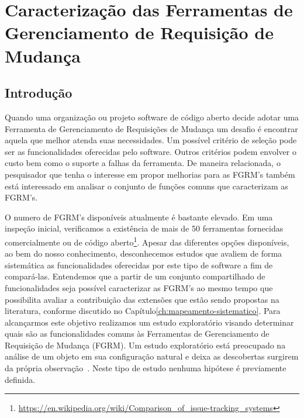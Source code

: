 \chapter{Caracterização das Ferramentas de Gerenciamento de Requisição de
	Mudança}
\label{ch:caracterizacao}


\section{Introdução}

Quando uma organização ou projeto software de código aberto decide adotar uma
Ferramenta de Gerenciamento de Requisições de Mudança um desafio é encontrar
aquela que melhor atenda suas necessidades. Um possível critério de seleção pode
ser as funcionalidades oferecidas pelo software. Outros critérios podem envolver
o custo bem como o suporte a falhas da ferramenta. De maneira relacionada, o
pesquisador que tenha o interesse em propor melhorias para as FGRM's também está
interessado em analisar o conjunto de funções comuns que caracterizam as FGRM's.

O numero de FGRM's disponíveis atualmente é bastante elevado. Em uma inspeção
inicial, verificamos a existência de mais de 50 ferramentas fornecidas
comercialmente ou de código
aberto\footnote{\url{https://en.wikipedia.org/wiki/Comparison_of_issue-tracking_systems}}.
Apesar das diferentes opções disponíveis, ao bem do nosso conhecimento,
desconhecemos estudos que avaliem de forma sistemática as funcionalidades
oferecidas por este tipo de software a fim de compará-las. Entendemos que a
partir de um conjunto compartilhado de funcionalidades seja possível
caracterizar as FGRM's ao mesmo tempo que possibilita avaliar a contribuição das
extensões que estão sendo propostas na literatura, conforme discutido no
Capítulo\ref{ch:mapeamento-sistematico}.  Para alcançarmos este objetivo
realizamos um estudo exploratório visando determinar quais são as
funcionalidades comuns às Ferramentas de Gerenciamento de Requisição de Mudança
(FGRM). Um estudo exploratório está preocupado na análise de um objeto em sua
configuração natural e deixa as descobertas surgirem da própria
observação~\cite{wohlin2012experimentation}. Neste tipo de estudo nenhuma
hipótese é previamente definida.

